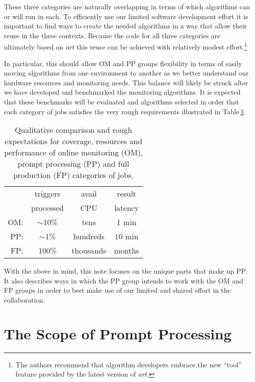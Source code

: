 \documentclass[pdftex,12pt,letter]{article}
\begin{document}
\noindent These three categories are naturally overlapping in terms of which algorithms
can or will run in each.  To efficiently use our limited software
development effort it is important to find ways to create the needed
algorithms in a way that allow their reuse in the three contexts.
Because the code for all three categories are ultimately based on
\textit{art} this reuse can be achieved with relatively modest
effort.\footnote{The authors recommend that algorithm developers
  embrace the new ``tool'' feature provided by the latest version of
  \textit{art}.}

In particular, this should allow OM and PP groups
flexibility in terms of easily moving algorithms from one environment
to another as we better understand our hardware resources and
monitoring needs.  This balance will likely be struck after we have
developed and benchmarked the monitoring algorithms.  It is expected
that these benchmarks will be evaluated and algorithms selected in
order that each category of jobs satisfies the very rough requirements
illustrated in Table\,\ref{tab:contexts}.

\begin{table}[h]
  \centering
  \begin{tabular}[h]{r|ccc}
    & triggers & avail & result \\
    & processed &  CPU & latency \\
    \hline
    OM: & $\sim 10$\% & tens & 1 min \\
    PP: & $\sim 1$\% & hundreds & 10 min \\
    FP: & 100\% & thousands & months \\
  \end{tabular}
  \caption{Qualitative comparison and rough expectations for coverage, resources and performance of online monitoring (OM), prompt processing (PP) and full production (FP) categories of jobs.}
  \label{tab:contexts}
\end{table}

\noindent
With the above in mind, this note focuses on the unique parts that
make up PP.  It also describes ways in which the PP group intends to
work with the OM and FP groups in order to best make use of our
limited and shared effort in the collaboration.

\section{The Scope of Prompt Processing}
\end{document}

